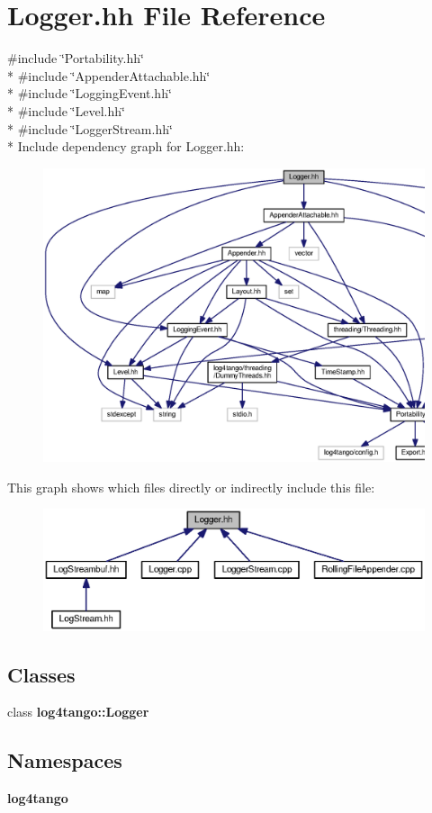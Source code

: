 \section{Logger.\-hh File Reference}
\label{Logger_8hh}
{\ttfamily \#include \char`\"{}Portability.\-hh\char`\"{}}\\*
{\ttfamily \#include \char`\"{}Appender\-Attachable.\-hh\char`\"{}}\\*
{\ttfamily \#include \char`\"{}Logging\-Event.\-hh\char`\"{}}\\*
{\ttfamily \#include \char`\"{}Level.\-hh\char`\"{}}\\*
{\ttfamily \#include \char`\"{}Logger\-Stream.\-hh\char`\"{}}\\*
Include dependency graph for Logger.\-hh\-:
\nopagebreak
\begin{figure}[H]
\begin{center}
\leavevmode
\includegraphics[width=350pt]{df/d63/Logger_8hh__incl}
\end{center}
\end{figure}
This graph shows which files directly or indirectly include this file\-:
\nopagebreak
\begin{figure}[H]
\begin{center}
\leavevmode
\includegraphics[width=350pt]{d3/d0f/Logger_8hh__dep__incl}
\end{center}
\end{figure}
\subsection*{Classes}
\begin{DoxyCompactItemize}
\item 
class {\bf log4tango\-::\-Logger}
\end{DoxyCompactItemize}
\subsection*{Namespaces}
\begin{DoxyCompactItemize}
\item 
{\bf log4tango}
\end{DoxyCompactItemize}
